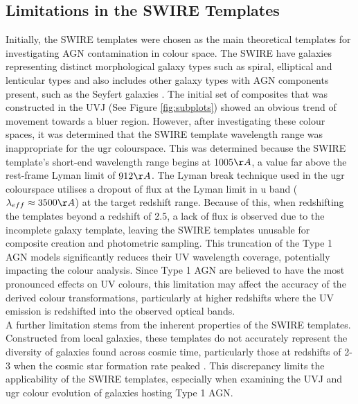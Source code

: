 \subsection{Limitations in the SWIRE Templates} Initially, the SWIRE templates \citep{polletta_spectral_2007} were chosen as the main theoretical templates for investigating AGN contamination in colour space. The SWIRE have galaxies representing distinct morphological galaxy types such as spiral, elliptical and lenticular types and also includes other galaxy types with AGN components present, such as the Seyfert galaxies \cite{seyfert_nuclear_1943}. The initial set of composites that was constructed in the UVJ (See Figure \ref{fig:subplots}) showed an obvious trend of movement towards a bluer region. However, after investigating these colour spaces, it was determined that the SWIRE template wavelength range was inappropriate for the ugr colourspace. This was determined because the SWIRE template's short-end wavelength range begins at 1005$\AA$, a value far above the rest-frame Lyman limit of $912\AA$. The Lyman break technique used in the ugr colourspace utilises a dropout of flux at the Lyman limit in u band ($\lambda_{eff}\approx 3500\AA$) at the target redshift range\citep{giavalisco_lyman-break_2002}. Because of this, when redshifting the templates beyond a redshift of 2.5, a lack of flux is observed due to the incomplete galaxy template, leaving the SWIRE templates unusable for composite creation and photometric sampling. This truncation of the Type 1 AGN models significantly reduces their UV wavelength coverage, potentially impacting the colour analysis.  Since Type 1 AGN are believed to have the most pronounced effects on UV colours, this limitation may affect the accuracy of the derived colour transformations, particularly at higher redshifts where the UV emission is redshifted into the observed optical bands.\\
A further limitation stems from the inherent properties of the SWIRE templates. Constructed from local galaxies, these templates do not accurately represent the diversity of galaxies found across cosmic time, particularly those at redshifts of 2-3 when the cosmic star formation rate peaked \citep{dominguez_extragalactic_2011, madau_cosmic_2014}. This discrepancy limits the applicability of the SWIRE templates, especially when examining the UVJ and ugr colour evolution of galaxies hosting Type 1 AGN.